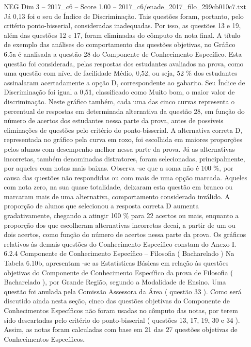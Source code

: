 \begin{textsample}{NEG Dim 3 – 2017\_c6 – Score 1.00 – 2017\_c6/enade\_2017\_filo\_299cb010c7.txt}
Já 0,13 foi o seu de Índice de Discriminação.
Tais questões foram, portanto, pelo critério ponto-bisserial, consideradas inadequadas.
Por isso, as questões 13 e 19, além das questões 12 e 17, foram eliminadas do cômputo da nota final.
A título de exemplo das análises do comportamento das questões objetivas, no Gráfico 6.5a é analisada a questão 28 do Componente de Conhecimento Específico.
Esta questão foi considerada, pelas respostas dos estudantes avaliados na prova, como uma questão com nível de facilidade Médio, 0,52, ou seja, 52 \% dos estudantes assinalaram acertadamente a opção D, correspondente ao gabarito.
Seu Índice de Discriminação foi igual a 0,51, classificado como Muito bom, o maior valor de discriminação.
Neste gráfico também, cada uma das cinco curvas representa o percentual de respostas em determinada alternativa da questão 28, em função do número de acertos dos estudantes nessa parte da prova, antes de possíveis eliminações de questões pelo critério do ponto-bisserial.
A alternativa correta D, representada no gráfico pela curva em roxo, foi escolhida em maiores proporções pelos alunos com desempenho melhor nessa parte da prova.
Já as alternativas incorretas, também denominadas distratores, foram selecionadas, principalmente, por aqueles com notas mais baixas.
Observa -se que a soma não é 100 \%, por causa das questões não respondidas ou com mais de uma opção marcada.
Aqueles com nota zero, na sua quase totalidade, deixaram esta questão em branco ou marcaram mais de uma alternativa, comportamento considerado inválido.
A proporção de alunos que selecionou a resposta correta D aumenta gradativamente, chegando a atingir 100 \% para 22 acertos ou mais, enquanto a proporção dos que escolheram alternativas incorretas decai, a partir de um ou dois acertos, como função do número de acertos nessa parte da prova.
Os gráficos relativos às demais questões do Conhecimento Específico constam do Anexo I. 6.2.4 Componente de Conhecimento Específico – Filosofia ( Bacharelado ) Na Tabela 6.10b, apresentam -se as Estatísticas Básicas em relação às questões objetivas do Componente de Conhecimento Específico da prova de Filosofia ( Bacharelado ), por Grande Região, segundo a Modalidade de Ensino.
Uma questão foi anulada pela Comissão Assessora da Área ( questão 33 ).
Como será discutido ainda nesta seção, cinco das questões objetivas do Componente de Conhecimentos Específicos não foram usadas no cômputo das notas, por terem sido descartadas pelo critério do ponto-bisserial ( questões 13, 17, 19, 30 e 34 ).
Assim, as notas foram calculadas com base em 21 das 27 questões objetivas de Conhecimentos Específicos.

\end{textsample}
